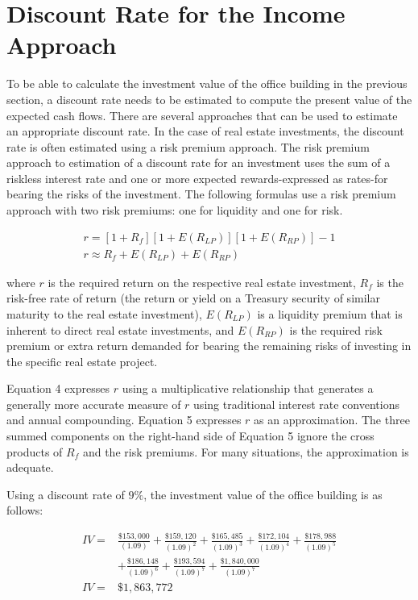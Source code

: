 \documentclass[11pt]{article}
\begin{document}
\section*{Discount Rate for the Income Approach}
To be able to calculate the investment value of the office building in the previous section, a discount rate needs to be estimated to compute the present value of the expected cash flows. There are several approaches that can be used to estimate an appropriate discount rate. In the case of real estate investments, the discount rate is often estimated using a risk premium approach. The risk premium approach to estimation of a discount rate for an investment uses the sum of a riskless interest rate and one or more expected rewards-expressed as rates-for bearing the risks of the investment. The following formulas use a risk premium approach with two risk premiums: one for liquidity and one for risk.


\begin{gather*}
r=\left[1+R_{f}\right]\left[1+E\left(R_{L P}\right)\right]\left[1+E\left(R_{R P}\right)\right]-1  \tag{4}\\
r \approx R_{f}+E\left(R_{L P}\right)+E\left(R_{R P}\right) \tag{5}
\end{gather*}


where $r$ is the required return on the respective real estate investment, $R_{f}$ is the risk-free rate of return (the return or yield on a Treasury security of similar maturity to the real estate investment), $E\left(R_{L P}\right)$ is a liquidity premium that is inherent to direct real estate investments, and $E\left(R_{R P}\right)$ is the required risk premium or extra return demanded for bearing the remaining risks of investing in the specific real estate project.

Equation 4 expresses $r$ using a multiplicative relationship that generates a generally more accurate measure of $r$ using traditional interest rate conventions and annual compounding. Equation 5 expresses $r$ as an approximation. The three summed components on the right-hand side of Equation 5 ignore the cross products of $R_{f}$ and the risk premiums. For many situations, the approximation is adequate.

Using a discount rate of $9 \%$, the investment value of the office building is as follows:

$$
\begin{aligned}
I V= & \frac{\$ 153,000}{(1.09)}+\frac{\$ 159,120}{(1.09)^{2}}+\frac{\$ 165,485}{(1.09)^{3}}+\frac{\$ 172,104}{(1.09)^{4}}+\frac{\$ 178,988}{(1.09)^{5}} \\
& +\frac{\$ 186,148}{(1.09)^{6}}+\frac{\$ 193,594}{(1.09)^{7}}+\frac{\$ 1,840,000}{(1.09)^{7}} \\
I V= & \$ 1,863,772
\end{aligned}
$$
\end{document}
